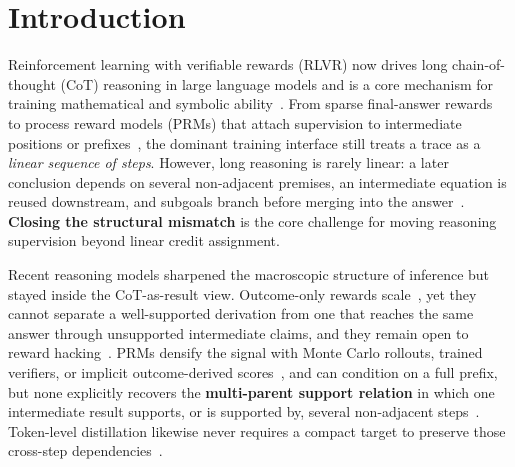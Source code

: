 \section{Introduction}
\label{sec:introduction}

Reinforcement learning with verifiable rewards (RLVR) now drives long chain-of-thought (CoT) reasoning in large language models and is a core mechanism for training mathematical and symbolic ability~\citep{wei2022chain,kojima2022large,deepseekr1,yeo2025demystify,shao2024deepseekmath,ke2026com}. From sparse final-answer rewards~\citep{cobbe2021gsm8k} to process reward models (PRMs) that attach supervision to intermediate positions or prefixes~\citep{lightman2023lets,wang2024math,uesato2022solving}, the dominant training interface still treats a trace as a \emph{linear sequence of steps}. However, long reasoning is rarely linear: a later conclusion depends on several non-adjacent premises, an intermediate equation is reused downstream, and subgoals branch before merging into the answer~\citep{besta2024graph,zhong2026chainsdag}. \textbf{Closing the structural mismatch} is the core challenge for moving reasoning supervision beyond linear credit assignment.

Recent reasoning models sharpened the macroscopic structure of inference but stayed inside the CoT-as-result view. Outcome-only rewards scale~\citep{deepseekr1,yu2025dapo,lambert2024tulu3}, yet they cannot separate a well-supported derivation from one that reaches the same answer through unsupported intermediate claims, and they remain open to reward hacking~\citep{gao2023scaling,skalse2022defining}. PRMs densify the signal with Monte Carlo rollouts, trained verifiers, or implicit outcome-derived scores~\citep{wang2024math,luo2024omegaprm,zhang2025qwen25mathprm,thinkprm2025,genprm2026,yuan2024implicitprm,she2025rprm}, and can condition on a full prefix, but none explicitly recovers the \textbf{multi-parent support relation} in which one intermediate result supports, or is supported by, several non-adjacent steps~\citep{wang2025com}. Token-level distillation likewise never requires a compact target to preserve those cross-step dependencies~\citep{agarwal2024gkd}.

